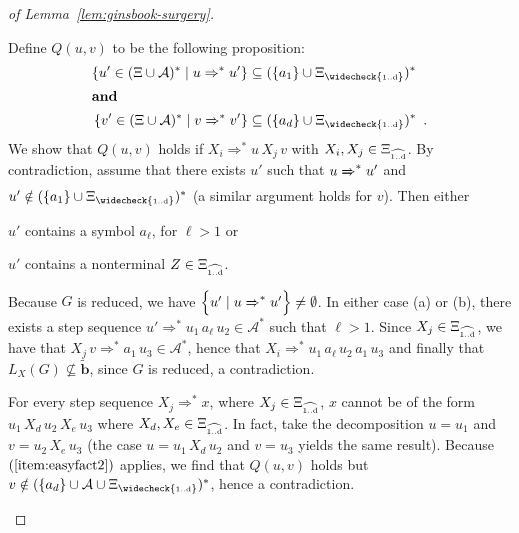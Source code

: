 \documentclass[final]{llncs}
\def\set#1{{\left\{ #1 \right\}}}
\def\patt{{\widetilde{\mathbf{b}}}}
\def\Vars{\ensuremath{\Xi}}
\def\Varsi{\ensuremath{\Xi_{\widecheck{\text{\tiny 1..d}}}}}
\def\Varse{\ensuremath{\Xi_{\widehat{\text{\tiny 1..d}}}}}
\begin{document}
\begin{proof}[of Lemma~\ref{lem:ginsbook-surgery}]
\begin{compactenum}
  \item\label{item:easyfact2} Define \(Q(u,v)\) to be the following proposition:
\begin{align*}
\set{u'\in (\Vars\cup\mathcal{A})^* \mid u\Rightarrow^* u' } &\subseteq ( \set{a_1} \cup \Varsi)^*\\
\shortintertext{\textbf{and}}
\set{v'\in (\Vars\cup\mathcal{A})^* \mid v\Rightarrow^* v' } &\subseteq ( \set{a_d} \cup \Varsi)^*\enspace.
\end{align*}
We show that \( Q(u,v)\) holds if \(X_i \Rightarrow^* u\, X_j\, v\)
with \(X_i,X_j\in\Varse\). By contradiction, assume that there exists
\(u'\) such that \(u \xRightarrow{}^* u'\) and \(u' \notin ( \set{a_1}
\cup \Varsi)^*\) (a similar argument holds for \(v\)).
Then either \begin{inparaenum}
\item \(u'\) contains a symbol \(a_\ell\), for \(\ell>1\) or 
\item \(u'\) contains a nonterminal \(Z \in \Varse\).
\end{inparaenum}
Because \(G\) is reduced, we have \(\set{u' \mid u \xRightarrow{}^* u'}
\neq \emptyset\). In either case (a) or (b), there exists a step
sequence \(u' \Rightarrow^* u_1\, a_\ell\, u_2 \in \mathcal{A}^* \) such
that \(\ell>1\). Since \(X_j\in\Varse\), we have that \(X_j\, v
\Rightarrow^* a_1\, u_3 \in \mathcal{A}^*\), hence that \(
X_i\Rightarrow^* u_1\, a_\ell\, u_2\, a_1\, u_3 \) and finally that
\(L_X(G) \nsubseteq \patt\), since \(G\) is reduced, a contradiction.

\item\label{item:easyfact3} For every step sequence \(X_j
  \Rightarrow^* x\), where \(X_j\in\Varse\), \(x\) cannot be of the
  form \(u_1\, X_d\, u_2\, X_e\, u_3\) where \(X_d,X_e\in \Varse\).
  In fact, take the decomposition \(u = u_1 \) and \( v = u_2\, X_e\,
  u_3 \) (the case \(u = u_1\, X_d\, u_2\) and \( v = u_3\) yields the
  same result). Because \( (\ref{item:easyfact2}) \) applies, we find
	that \( Q(u,v)\) holds but \(v\notin (\set{a_d}\cup \mathcal{A} \cup\Varsi)^*\), hence a contradiction.


\end{compactenum}
\end{proof}
\end{document}
